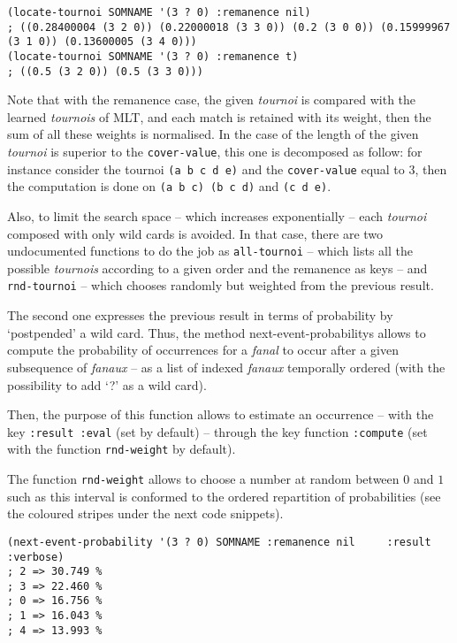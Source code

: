 \bigskip
\begin{lstlisting}[language=N3]
(locate-tournoi SOMNAME '(3 ? 0) :remanence nil)
; ((0.28400004 (3 2 0)) (0.22000018 (3 3 0)) (0.2 (3 0 0)) (0.15999967 (3 1 0)) (0.13600005 (3 4 0)))
(locate-tournoi SOMNAME '(3 ? 0) :remanence t)
; ((0.5 (3 2 0)) (0.5 (3 3 0)))
\end{lstlisting}
\bigskip

Note that with the remanence case, the given \textit{tournoi} is compared with the learned \textit{tournois} of MLT, and each match is retained with its weight, then the sum of all these weights is normalised. In the case of the length of the given \textit{tournoi} is superior to the \texttt{cover-value}, this one is decomposed as follow: for instance consider the tournoi \texttt{(a b c d e)} and the \texttt{cover-value} equal to 3, then the computation is done on \texttt{(a b c) (b c d)} and  \texttt{(c d e)}.

\smallskip

Also, to limit the search space -- which increases exponentially -- each \textit{tournoi} composed with only wild cards is avoided. In that case, there are two undocumented functions to do the job as \texttt{all-tournoi} -- which lists all the possible \textit{tournois} according to a given order and the remanence as keys -- and \texttt{rnd-tournoi} -- which chooses randomly but weighted from the previous result.

\bigskip

The second one expresses the previous result in terms of probability by `postpended' a wild card. 
Thus, the method \glspl{next-event-probability} allows to compute the probability of occurrences for a \textit{fanal} to occur after a given subsequence of \textit{fanaux} -- as a list of indexed \textit{fanaux} temporally ordered (with the possibility to add `?' as a wild card).

\smallskip

Then, the purpose of this function allows to estimate an occurrence -- with the key \texttt{:result :eval} (set by default) -- through the key function \texttt{:compute} (set with the function \texttt{rnd-weight} by default). 

The function \texttt{rnd-weight} allows to choose a number at random between $0$ and $1$ such as this interval is conformed to the ordered repartition of probabilities (see the coloured stripes under the next code snippets).

\bigskip

\begin{lstlisting}[language=N3]
(next-event-probability '(3 ? 0) SOMNAME :remanence nil     :result :verbose) 
; 2 => 30.749 %
; 3 => 22.460 %
; 0 => 16.756 %
; 1 => 16.043 %
; 4 => 13.993 %
\end{lstlisting}

